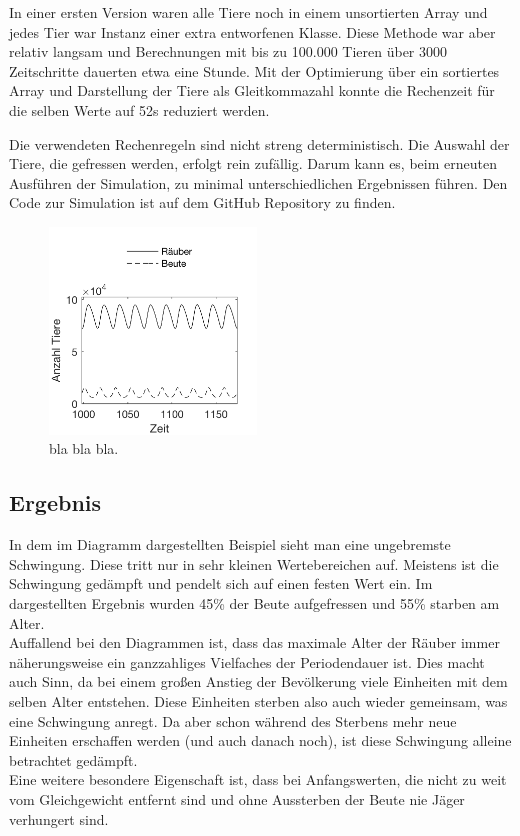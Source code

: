 \documentclass[a4paper,twoside]{article}
\begin{document}
	In einer ersten Version waren alle Tiere noch in einem unsortierten Array und jedes Tier war Instanz einer extra entworfenen Klasse. Diese Methode war aber relativ langsam und  Berechnungen mit bis zu 100.000 Tieren über 3000 Zeitschritte dauerten etwa eine Stunde. Mit der Optimierung über ein sortiertes Array und Darstellung der Tiere als Gleitkommazahl konnte die Rechenzeit für die selben Werte auf 52s reduziert werden.
	
	Die verwendeten Rechenregeln sind nicht streng deterministisch. Die Auswahl der Tiere, die gefressen werden, erfolgt rein zufällig. Darum kann es, beim erneuten Ausführen der Simulation, zu minimal unterschiedlichen Ergebnissen führen. Den Code zur Simulation ist auf dem GitHub Repository \cite{GitHub} zu finden.
	\begin{figure}[!h]
  		\centering
 		\includegraphics[width=5.5cm]{Diagramme/agent_model_oscillation.png}
  		\caption{bla bla bla.}
  		\label{fig:agent_model_oscillation}
	\end{figure}
	\subsection{Ergebnis}
	In dem im Diagramm dargestellten Beispiel sieht man eine ungebremste Schwingung. Diese tritt nur in sehr kleinen Wertebereichen auf. Meistens ist die Schwingung gedämpft und pendelt sich auf einen festen Wert ein. Im dargestellten Ergebnis wurden 45\% der Beute aufgefressen und 55\% starben am Alter.\\
	Auffallend bei den Diagrammen ist, dass das maximale Alter der Räuber immer näherungsweise ein ganzzahliges Vielfaches der Periodendauer ist. Dies macht auch Sinn, da bei einem großen Anstieg der Bevölkerung viele Einheiten mit dem selben Alter entstehen. Diese Einheiten sterben also auch wieder gemeinsam, was eine Schwingung anregt. Da aber schon während des Sterbens mehr neue Einheiten erschaffen werden (und auch danach noch), ist diese Schwingung alleine betrachtet gedämpft. \\
	Eine weitere besondere Eigenschaft ist, dass bei Anfangswerten, die nicht zu weit vom Gleichgewicht entfernt sind und ohne Aussterben der Beute nie Jäger verhungert sind. 
\end{document}

